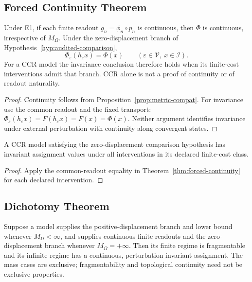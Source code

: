 \subsection{Forced Continuity Theorem}

\begin{theorem}\label{thm:forced-continuity}
Under E1, if each finite readout $g_n=\phi_n\circ p_n$ is continuous, then $\Phi$ is continuous, irrespective of $M_\Omega$. Under the zero-displacement branch of Hypothesis~\ref{hyp:audited-comparison},
\[
\Phi_\varepsilon(h_\varepsilon x)=\Phi(x)
\qquad(\varepsilon\in\mathcal V,\ x\in\mathcal I).
\]
For a CCR model the invariance conclusion therefore holds when its finite-cost interventions admit that branch. CCR alone is not a proof of continuity or of readout naturality.
\end{theorem}

\begin{proof}
Continuity follows from Proposition~\ref{prop:metric-compat}. For invariance use the common readout and the fixed transport: $\Phi_\varepsilon(h_\varepsilon x)=F(h_\varepsilon x)=F(x)=\Phi(x)$. Neither argument identifies invariance under external perturbation with continuity along convergent states.
\end{proof}

\begin{corollary}
A CCR model satisfying the zero-displacement comparison hypothesis has invariant assignment values under all interventions in its declared finite-cost class.
\end{corollary}

\begin{proof}
Apply the common-readout equality in Theorem~\ref{thm:forced-continuity} for each declared intervention.
\end{proof}

\subsection{Dichotomy Theorem}

\begin{theorem}\label{thm:dichotomy}
Suppose a model supplies the positive-displacement branch and lower bound whenever $M_\Omega<\infty$, and supplies continuous finite readouts and the zero-displacement branch whenever $M_\Omega=+\infty$. Then its finite regime is fragmentable and its infinite regime has a continuous, perturbation-invariant assignment. The mass cases are exclusive; fragmentability and topological continuity need not be exclusive properties.
\end{theorem}

